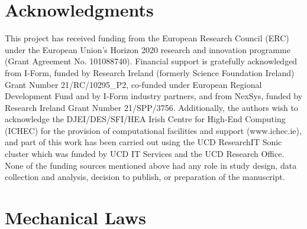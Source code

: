 \documentclass[review,3p]{elsarticle}
\begin{document}
\section*{Acknowledgments}
%
This project has received funding from the European Research Council (ERC) under the European Union’s Horizon 2020 research and innovation programme (Grant Agreement No. 101088740).
Financial support is gratefully acknowledged from I-Form, funded by Research Ireland (formerly Science Foundation Ireland)
Grant Number {21/RC/10295\_P2}, co-funded under European Regional Development Fund and by I-Form industry partners, and from NexSys, funded by Research Ireland Grant Number 21/SPP/3756.
Additionally, the authors wish to acknowledge the DJEI/DES/SFI/HEA Irish Centre for High-End Computing (ICHEC) for the provision of computational facilities and support (www.ichec.ie), and part of this work has been carried out using the UCD ResearchIT Sonic cluster which was funded by UCD IT Services and the UCD Research Office. None of the funding sources mentioned above had any role in study design, data collection and analysis, decision to publish, or preparation of the manuscript.
%



\appendix

\setcounter{figure}{0}
\setcounter{subfigure}{0}

\renewcommand{\thefigure}{\Alph{section}.\arabic{figure}}

\renewcommand{\thesubfigure}{(\alph{subfigure})}

\makeatletter
\renewcommand{\p@subfigure}{\thefigure}
\makeatother

\renewcommand{\theHfigure}{\Alph{section}.\arabic{figure}}
\renewcommand{\theHsubfigure}{\Alph{section}.\arabic{figure}.\alph{subfigure}}

%
%
\section{Mechanical Laws}
\label{app:mechLaws}
%
%
\end{document}

